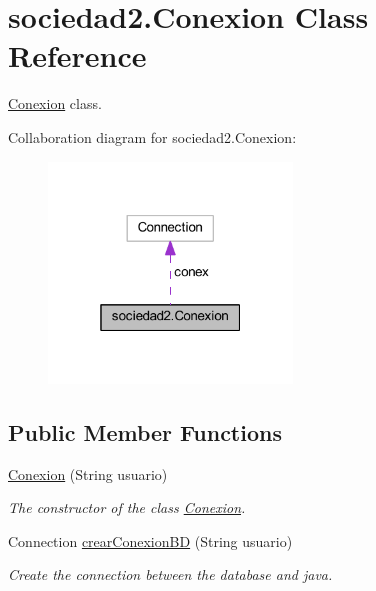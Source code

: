\hypertarget{classsociedad2_1_1_conexion}{}\section{sociedad2.\+Conexion Class Reference}
\label{classsociedad2_1_1_conexion}


\mbox{\hyperlink{classsociedad2_1_1_conexion}{Conexion}} class.  




Collaboration diagram for sociedad2.\+Conexion\+:\nopagebreak
\begin{figure}[H]
\begin{center}
\leavevmode
\includegraphics[width=184pt]{classsociedad2_1_1_conexion__coll__graph}
\end{center}
\end{figure}
\subsection*{Public Member Functions}
\begin{DoxyCompactItemize}
\item 
\mbox{\hyperlink{classsociedad2_1_1_conexion_ad0e04b0c05e775d68a227d3421f1bbd0}{Conexion}} (String usuario)
\begin{DoxyCompactList}\small\item\em The constructor of the class \mbox{\hyperlink{classsociedad2_1_1_conexion}{Conexion}}. \end{DoxyCompactList}\item 
Connection \mbox{\hyperlink{classsociedad2_1_1_conexion_a9580aeb5847f414f376986051642e766}{crear\+Conexion\+BD}} (String usuario)
\begin{DoxyCompactList}\small\item\em Create the connection between the database and java. \end{DoxyCompactList}\end{DoxyCompactItemize}


